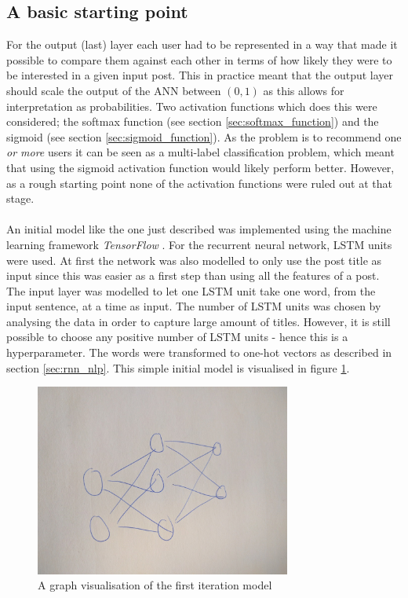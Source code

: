 \subsection{A basic starting point}\label{method_basic_start_point}
For the output (last) layer each user had to be represented in a way that made it possible to compare them against each other in terms of how likely they were to be interested in a given input post. This in practice meant that the output layer should scale the output of the ANN between $(0,1)$ as this allows for interpretation as probabilities. Two activation functions which does this were considered; the softmax function (see section \ref{sec:softmax_function}) and the sigmoid (see section \ref{sec:sigmoid_function}). As the problem is to recommend one \textit{or more} users it can be seen as a multi-label classification problem, which meant that using the sigmoid activation function would likely perform better. However, as a rough starting point none of the activation functions were ruled out at that stage.
\\\\
An initial model like the one just described was implemented using the machine learning framework \textit{TensorFlow} \parencite{tensorflow2015whitepaper}. For the recurrent neural network, LSTM units were used. At first the network was also modelled to only use the post title as input since this was easier as a first step than using all the features of a post. The input layer was modelled to let one LSTM unit take one word, from the input sentence, at a time as input. The number of LSTM units was chosen by analysing the data in order to capture large amount of titles. However, it is still possible to choose any positive number of LSTM units - hence this is a hyperparameter. The words were transformed to one-hot vectors as described in section \ref{sec:rnn_nlp}. This simple initial model is visualised in figure \ref{fig:first_simple_model}.
\begin{figure}[h]
    \centering
    \includegraphics[width=0.75\textwidth]{figure/ann/ann}
    \caption{A graph visualisation of the first iteration model}
    \label{fig:first_simple_model}
\end{figure}
